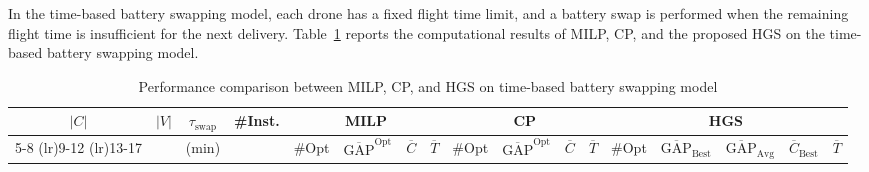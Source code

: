 \documentclass[3p, authoryear, 11pt]{elsarticle}
\begin{document}
In the time-based battery swapping model, each drone has a fixed flight time limit, and a battery swap is performed when the remaining flight time is insufficient for the next delivery. Table~\ref{tab:performance_milp_cp_hgs_time_based} reports the computational results of MILP, CP, and the proposed HGS on the time-based battery swapping model.
\begin{table}[H]
    \centering
    \setlength{\tabcolsep}{3pt} %
    \renewcommand{\arraystretch}{0.95} %
    \caption{Performance comparison between MILP, CP, and HGS on time-based battery swapping model}
    \label{tab:performance_milp_cp_hgs_time_based}
    \scriptsize
    \setlength{\tabcolsep}{2pt}
    \begin{tabular}{cccc cccc cccc ccccc}
    \toprule
    \multirow{2}{*}{$|C|$} & 
    \multirow{2}{*}{$|V|$} & 
    \multirow{2}{*}{$\tau_{\text{swap}}$} & 
    \multirow{2}{*}{\#Inst.} &
    \multicolumn{4}{c}{MILP} & 
    \multicolumn{4}{c}{CP} & 
    \multicolumn{5}{c}{HGS} \\
    \cmidrule(lr){5-8} \cmidrule(lr){9-12} \cmidrule(lr){13-17}
    & & (min) & 
    & \#Opt 
    & $\overline{\mathrm{GAP}}^{\mathrm{Opt}}$ 
    & $\overline{C}$ 
    & $\overline{T}$ 
    & \#Opt 
    & $\overline{\mathrm{GAP}}^{\mathrm{Opt}}$ 
    & $\overline{C}$ 
    & $\overline{T}$ 
    & \#Opt 
    & $\overline{\mathrm{GAP}}_{\text{Best}}$ 
    & $\overline{\mathrm{GAP}}_{\text{Avg}}$ 
    & $\overline{C}_{\text{Best}}$ 
    & $\overline{T}$ \\
    \midrule
    

\end{tabular}
\end{table}
\end{document}
